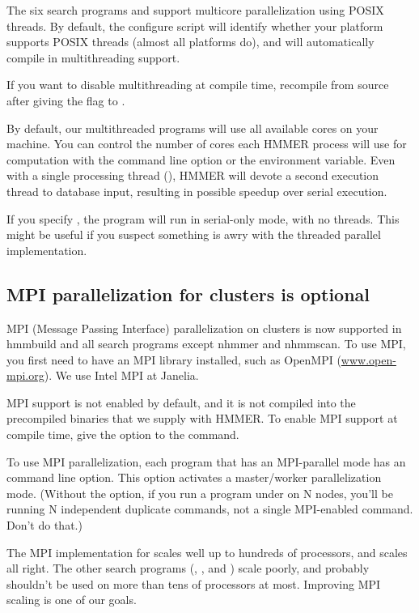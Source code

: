 The six search programs and  support multicore
parallelization using POSIX threads. By default, the configure script
will identify whether your platform supports POSIX threads (almost all
platforms do), and will automatically compile in multithreading
support.

If you want to disable multithreading at compile time, recompile from
source after giving the  flag to
.

By default, our multithreaded programs will use all available cores on
your machine. You can control the number of cores each HMMER process
will use for computation with the  command line
option or the  environment variable. Even with a
single processing thread (), HMMER will devote a second
execution thread to database input, resulting in possible speedup
over serial execution.

If you specify , the program will run in serial-only
mode, with no threads. This might be useful if you suspect something
is awry with the threaded parallel implementation.

\subsection{MPI parallelization for clusters is optional}

MPI (Message Passing Interface) parallelization on clusters is now
supported in hmmbuild and all search programs except nhmmer and 
nhmmscan. To use MPI, you first need to have an MPI library installed, 
such as OpenMPI (\url{www.open-mpi.org}). We use Intel MPI at Janelia.

MPI support is not enabled by default, and it is not compiled into the
precompiled binaries that we supply with HMMER. To enable MPI support
at compile time, give the  option to the
 command.

To use MPI parallelization, each program that has an MPI-parallel mode
has an  command line option. This option activates a
master/worker parallelization mode. (Without the  option,
if you run a program under  on N nodes, you'll be
running N independent duplicate commands, not a single MPI-enabled
command. Don't do that.)

The MPI implementation for  scales well up to hundreds
of processors, and  scales all right. The other search
programs (, , and ) scale
poorly, and probably shouldn't be used on more than tens of processors
at most. Improving MPI scaling is one of our goals.


